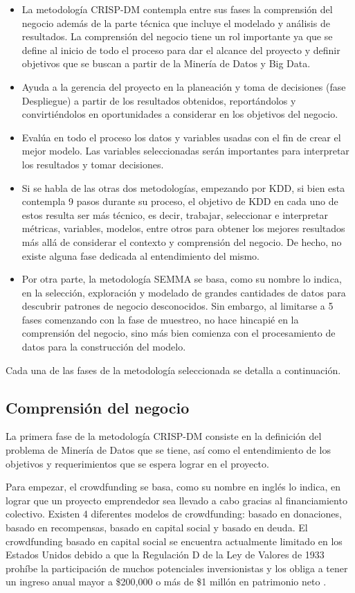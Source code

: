 \begin{itemize}
	\item La metodología CRISP-DM contempla entre sus fases la comprensión del negocio además de la parte técnica que incluye el modelado y análisis de resultados. La comprensión del negocio tiene un rol importante ya que se define al inicio de todo el proceso para dar el alcance del proyecto y definir objetivos que se buscan a partir de la Minería de Datos y Big Data.
	\item Ayuda a la gerencia del proyecto en la planeación y toma de decisiones (fase Despliegue) a partir de los resultados obtenidos, reportándolos y convirtiéndolos en oportunidades a considerar en los objetivos del negocio.
	\item Evalúa en todo el proceso los datos y variables usadas con el fin de crear el mejor modelo. Las variables seleccionadas serán importantes para interpretar los resultados y tomar decisiones.
	\item Si se habla de las otras dos metodologías, empezando por KDD, si bien esta contempla 9 pasos durante su proceso, el objetivo de KDD en cada uno de estos resulta ser más técnico, es decir, trabajar, seleccionar e interpretar métricas, variables, modelos, entre otros para obtener los mejores resultados más allá de considerar el contexto y comprensión del negocio. De hecho, no existe alguna fase dedicada al entendimiento del mismo.
	\item Por otra parte, la metodología SEMMA se basa, como su nombre lo indica, en la selección, exploración y modelado de grandes cantidades de datos para descubrir patrones de negocio desconocidos. Sin embargo, al limitarse a 5 fases comenzando con la fase de muestreo, no hace hincapié en la comprensión del negocio, sino más bien comienza con el procesamiento de datos para la construcción del modelo.
\end{itemize}

Cada una de las fases de la metodología seleccionada se detalla a continuación.

\subsection{Comprensión del negocio}
La primera fase de la metodología CRISP-DM consiste en la definición del problema de Minería de Datos que se tiene, así como el entendimiento de los objetivos y requerimientos que se espera lograr en el proyecto.

Para empezar, el crowdfunding se basa, como su nombre en inglés lo indica, en lograr que un proyecto emprendedor sea llevado a cabo gracias al financiamiento colectivo. Existen 4 diferentes modelos de crowdfunding: basado en donaciones, basado en recompensas, basado en capital social y basado en deuda. El crowdfunding basado en capital social se encuentra actualmente limitado en los Estados Unidos debido a que la Regulación D de la Ley de Valores de 1933 prohíbe la participación de muchos potenciales inversionistas y los obliga a tener un ingreso anual mayor a \$200,000 o más de \$1 millón en patrimonio neto \parencite{cr_lichtig2015crowdfunding}.

